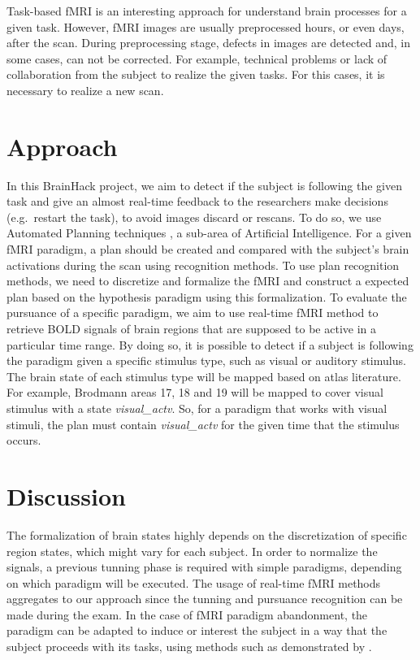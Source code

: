 \documentclass[twocolumn]{bmcart}%
\begin{document}
Task-based fMRI is an interesting approach for understand brain
processes for a given task. However, fMRI images are usually
preprocessed hours, or even days, after the scan. During preprocessing
stage, defects in images are detected and, in some cases, can not be
corrected. For example, technical problems or lack of collaboration from
the subject to realize the given tasks. For this cases, it is necessary
to realize a new scan.

\section{Approach}\label{approach}

In this BrainHack project, we aim to detect if the subject is following
the given task and give an almost real-time feedback to the researchers
make decisions (e.g.~restart the task), to avoid images discard or
rescans. To do so, we use Automated Planning techniques
\cite{Sukthankar2014}, a sub-area of Artificial Intelligence. For a
given fMRI paradigm, a plan should be created and compared with the
subject's brain activations during the scan using recognition methods.
To use plan recognition methods, we need to discretize and formalize the
fMRI and construct a expected plan based on the hypothesis paradigm
using this formalization. To evaluate the pursuance of a specific
paradigm, we aim to use real-time fMRI method to retrieve BOLD signals
of brain regions that are supposed to be active in a particular time
range. By doing so, it is possible to detect if a subject is following
the paradigm given a specific stimulus type, such as visual or auditory
stimulus. The brain state of each stimulus type will be mapped based on
atlas literature. For example, Brodmann areas 17, 18 and 19 will be
mapped to cover visual stimulus with a state \emph{visual\_actv}. So,
for a paradigm that works with visual stimuli, the plan must contain
\emph{visual\_actv} for the given time that the stimulus occurs.

\section{Discussion}\label{discussion}

The formalization of brain states highly depends on the discretization
of specific region states, which might vary for each subject. In order
to normalize the signals, a previous tunning phase is required with
simple paradigms, depending on which paradigm will be executed. The
usage of real-time fMRI methods aggregates to our approach since the
tunning and pursuance recognition can be made during the exam. In the
case of fMRI paradigm abandonment, the paradigm can be adapted to induce
or interest the subject in a way that the subject proceeds with its
tasks, using methods such as demonstrated by \cite{Dongha2011}.
\end{document}
